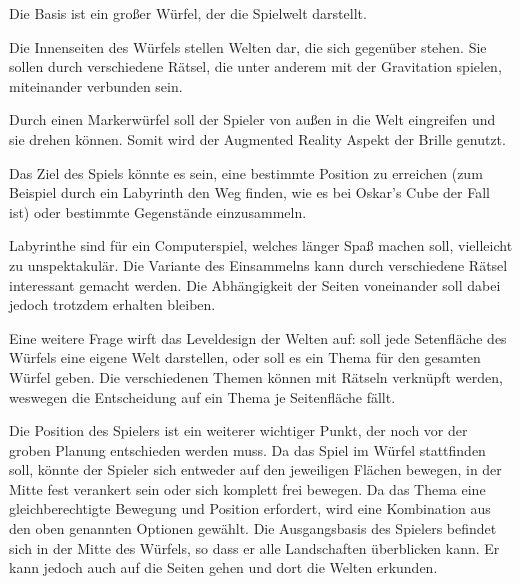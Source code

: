 Die Basis ist ein großer Würfel, der die Spielwelt darstellt. 

Die Innenseiten des Würfels stellen Welten dar, die sich gegenüber stehen. Sie sollen durch verschiedene Rätsel, die unter anderem mit der Gravitation spielen, miteinander verbunden sein. 

Durch einen Markerwürfel soll der Spieler von außen in die Welt eingreifen und sie drehen können. Somit wird der Augmented Reality Aspekt der Brille genutzt. 

Das Ziel des Spiels könnte es sein, eine bestimmte Position zu erreichen (zum Beispiel durch ein Labyrinth den Weg finden, wie es bei Oskar's Cube der Fall ist) oder bestimmte Gegenstände einzusammeln.
   
Labyrinthe sind für ein Computerspiel, welches länger Spaß machen soll, vielleicht zu unspektakulär. Die Variante des Einsammelns kann durch verschiedene Rätsel interessant gemacht werden. Die Abhängigkeit der Seiten voneinander soll dabei jedoch trotzdem erhalten bleiben.

Eine weitere Frage wirft das Leveldesign der Welten auf: soll jede Setenfläche des Würfels eine eigene Welt darstellen, oder soll es ein Thema für den gesamten Würfel geben. Die verschiedenen Themen können mit Rätseln verknüpft werden, weswegen die Entscheidung auf ein Thema je Seitenfläche fällt.

Die Position des Spielers ist ein weiterer wichtiger Punkt, der noch vor der groben Planung entschieden werden muss. Da das Spiel im Würfel stattfinden soll, könnte der Spieler sich entweder auf den jeweiligen Flächen bewegen, in der Mitte fest verankert sein oder sich komplett frei bewegen. Da das Thema eine gleichberechtigte Bewegung und Position erfordert, wird eine Kombination aus den oben genannten Optionen gewählt. Die Ausgangsbasis des Spielers befindet sich in der Mitte des Würfels, so dass er alle Landschaften überblicken kann. Er kann jedoch auch auf die Seiten gehen und dort die Welten erkunden.